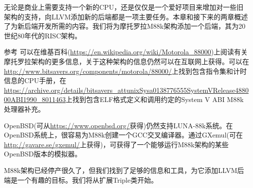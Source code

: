 无论是商业上需要支持一个新的CPU，还是仅仅是一个爱好项目来增加对一些旧架构的支持，向LLVM添加新的后端都是一项主要任务。本章和接下来的两章概述了为新后端开发所需的内容。我们将为摩托罗拉M88k架构添加一个后端，其为20世纪80年代的RISC架构。

\begin{myTip}{参考}
可以在维基百科(\url{https://en.wikipedia.org/wiki/Motorola_88000})上阅读有关摩托罗拉架构的更多信息，关于这种架构的信息仍然可以在互联网上获得。可以在\url{http://www.bitsavers.org/components/motorola/88000/}上找到包含指令集和计时信息的CPU手册，在\url{https://archive.org/details/bitsavers_attunixSysa0138776555SystemVRelease488000ABI1990_8011463}上找到包含ELF格式定义和调用约定的System V ABI M88k处理器补充。

OpenBSD(可从\url{https://www.openbsd.org/}获得)仍然支持LUNA-88k系统。在OpenBSD系统上，很容易为M88k创建一个GCC交叉编译器。通过GXemul(可在\url{http://gavare.se/gxemul/}上获得)，可获得了一个能够运行M88k架构的某些OpenBSD版本的模拟器。
\end{myTip}

M88k架构已经停产很久了，但我们找到了足够的信息和工具，为它添加LLVM后端是一个有趣的目标。我们将从扩展Triple类开始。












